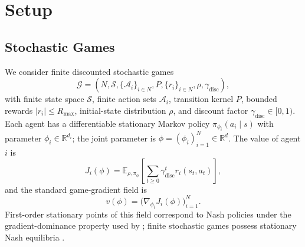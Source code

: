 \documentclass{article}
\theoremstyle{plain}
\theoremstyle{definition}
\theoremstyle{remark}
\newcommand{\E}{\mathbb{E}}
\newcommand{\R}{\mathbb{R}}
\begin{document}
\begin{table}[t]
  \centering
  \caption{Positioning among opponent-aware methods. ``Nash-preserving'' means the stated theory preserves the original game's stable Nash target rather than merely optimising a shaped meta-objective.}
  \label{tab:related}
\end{table}

\section{Setup}\label{sec:setup}

\subsection{Stochastic Games}

We consider finite discounted stochastic games
\[
\mathcal{G}=(N,\mathcal{S},\{\mathcal{A}_i\}_{i\in N},P,\{r_i\}_{i\in N},\rho,\gamma_{\mathrm{disc}}),
\]
with finite state space $\mathcal{S}$, finite action sets $\mathcal{A}_i$, transition kernel $P$, bounded rewards $|r_i|\le R_{\max}$, initial-state distribution $\rho$, and discount factor $\gamma_{\mathrm{disc}}\in[0,1)$. Each agent has a differentiable stationary Markov policy $\pi_{\phi_i}(a_i\mid s)$ with parameter $\phi_i\in\R^{d_i}$; the joint parameter is $\phi=(\phi_i)_{i=1}^N\in\R^d$. The value of agent $i$ is
\[
J_i(\phi)=\E_{\rho,\pi_\phi}\!\left[\sum_{t\ge 0}\gamma_{\mathrm{disc}}^t r_i(s_t,a_t)\right],
\]
and the standard game-gradient field is
\[
v(\phi)=\bigl(\nabla_{\phi_i}J_i(\phi)\bigr)_{i=1}^N.
\]
First-order stationary points of this field correspond to Nash policies under the gradient-dominance property used by \citet{giannou2022convergence}; finite stochastic games possess stationary Nash equilibria \citep{fink1964equilibrium}.
\end{document}
